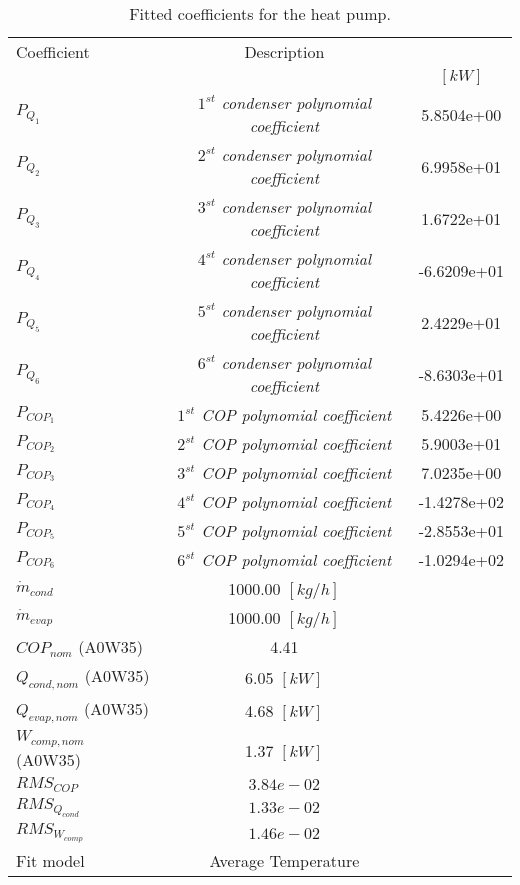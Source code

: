 \documentclass[english]{SPFShortReport}
\author{Dani Carbonell}
\begin{document}
\begin{table}[!ht]
\begin{small}
\caption{Fitted coefficients for the heat pump.}
\begin{center}
\resizebox{12cm}{!} 
{
\begin{tabular}{l | c c } 
\hline
\hline
Coefficient &Description & \\ 
 & &$[kW]$\\ 
\hline
$P_{Q_{1}}$ & \emph{$1^{st}$ condenser polynomial coefficient}  & 5.8504e+00    \\ 
$P_{Q_{2}}$ & \emph{$2^{st}$ condenser polynomial coefficient}  & 6.9958e+01    \\ 
$P_{Q_{3}}$ & \emph{$3^{st}$ condenser polynomial coefficient}  & 1.6722e+01    \\ 
$P_{Q_{4}}$ & \emph{$4^{st}$ condenser polynomial coefficient}  & -6.6209e+01    \\ 
$P_{Q_{5}}$ & \emph{$5^{st}$ condenser polynomial coefficient}  & 2.4229e+01    \\ 
$P_{Q_{6}}$ & \emph{$6^{st}$ condenser polynomial coefficient}  & -8.6303e+01    \\ 
\hline
$P_{COP_{1}}$ & \emph{$1^{st}$ COP polynomial coefficient}  & 5.4226e+00    \\ 
$P_{COP_{2}}$ & \emph{$2^{st}$ COP polynomial coefficient}  & 5.9003e+01    \\ 
$P_{COP_{3}}$ & \emph{$3^{st}$ COP polynomial coefficient}  & 7.0235e+00    \\ 
$P_{COP_{4}}$ & \emph{$4^{st}$ COP polynomial coefficient}  & -1.4278e+02    \\ 
$P_{COP_{5}}$ & \emph{$5^{st}$ COP polynomial coefficient}  & -2.8553e+01    \\ 
$P_{COP_{6}}$ & \emph{$6^{st}$ COP polynomial coefficient}  & -1.0294e+02    \\ 
\hline
$\dot m_{cond}$ & 1000.00 $[kg/h]$ \\ 
$\dot m_{evap}$ & 1000.00 $[kg/h]$ \\ 
\hline
$COP_{nom}$ (A0W35)& 4.41 \\ 
$Q_{cond,nom}$ (A0W35)& 6.05 $[kW]$\\ 
$Q_{evap,nom}$ (A0W35)& 4.68 $[kW]$\\ 
$W_{comp,nom}$ (A0W35)& 1.37 $[kW]$\\ 
\hline
 $RMS_{COP}$ & $3.84e-02$ \\ 
 $RMS_{Q_{cond}}$ & $1.33e-02$ \\ 
 $RMS_{W_{comp}}$ & $1.46e-02$ \\ 
\hline
Fit model & Average Temperature\\ 
\hline
\hline
\end{tabular}
}
\label{CoefTable}
\end{center}
\end{small}
\end{table}
\end{document}
